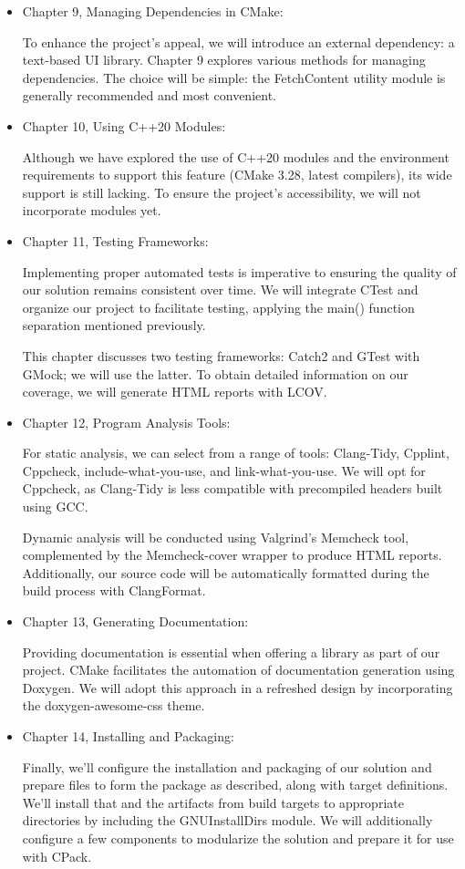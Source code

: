 \begin{itemize}
\item
Chapter 9, Managing Dependencies in CMake:

To enhance the project’s appeal, we will introduce an external dependency: a text-based UI library. Chapter 9 explores various methods for managing dependencies. The choice will be simple: the FetchContent utility module is generally recommended and most convenient.

\item
Chapter 10, Using C++20 Modules:

Although we have explored the use of C++20 modules and the environment requirements to support this feature (CMake 3.28, latest compilers), its wide support is still lacking. To ensure the project’s accessibility, we will not incorporate modules yet.

\item
Chapter 11, Testing Frameworks:

Implementing proper automated tests is imperative to ensuring the quality of our solution remains consistent over time. We will integrate CTest and organize our project to facilitate testing, applying the main() function separation mentioned previously.

This chapter discusses two testing frameworks: Catch2 and GTest with GMock; we will use the latter. To obtain detailed information on our coverage, we will generate HTML reports with LCOV.

\item
Chapter 12, Program Analysis Tools:

For static analysis, we can select from a range of tools: Clang-Tidy, Cpplint, Cppcheck, include-what-you-use, and link-what-you-use. We will opt for Cppcheck, as Clang-Tidy is less compatible with precompiled headers built using GCC.

Dynamic analysis will be conducted using Valgrind’s Memcheck tool, complemented by the Memcheck-cover wrapper to produce HTML reports. Additionally, our source code will be automatically formatted during the build process with ClangFormat.

\item
Chapter 13, Generating Documentation:

Providing documentation is essential when offering a library as part of our project. CMake facilitates the automation of documentation generation using Doxygen. We will adopt this approach in a refreshed design by incorporating the doxygen-awesome-css theme.

\item
Chapter 14, Installing and Packaging:

Finally, we’ll configure the installation and packaging of our solution and prepare files to form the package as described, along with target definitions. We’ll install that and the artifacts from build targets to appropriate directories by including the GNUInstallDirs module. We will additionally configure a few components to modularize the solution and prepare it for use with CPack.
\end{itemize}

